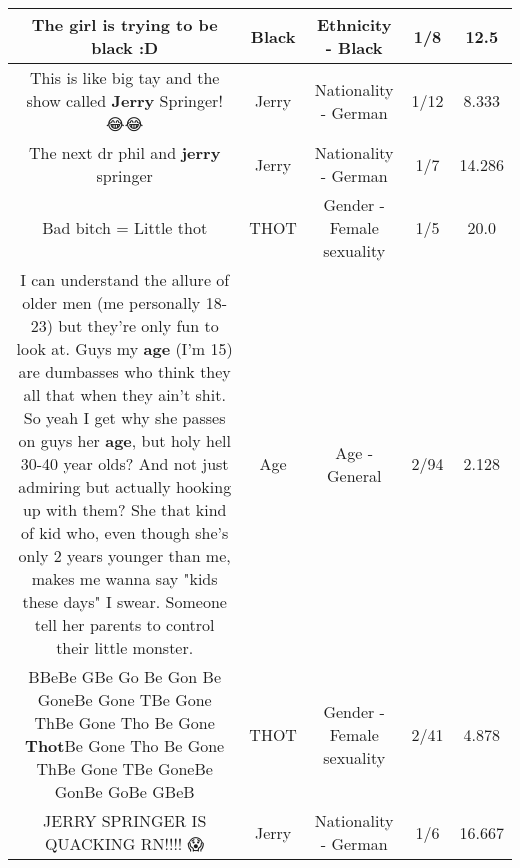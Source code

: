 \documentclass[11pt]{article}
\newlength\mylength
\begin{document}
\begin{center}
\begin{longtable}{|C{.65\mylength}|C{.30\mylength}|C{.12\mylength}|C{.12\mylength}|C{.12\mylength}|}
  \small The girl is trying to be \textbf{black} :D\normalsize   & Black & Ethnicity - Black & 1/8 & 12.5 \\  \hline
  \small This is like big tay and the show called \textbf{Jerry} Springer! 😂😂\normalsize   & Jerry & Nationality - German & 1/12 & 8.333 \\  \hline
  \small The next dr phil and \textbf{jerry} springer\normalsize   & Jerry & Nationality - German & 1/7 & 14.286 \\  \hline
  \small Bad bitch =  Little thot\normalsize   & THOT & Gender - Female sexuality & 1/5 & 20.0 \\  \hline
  \small I can understand the allure of older men (me personally 18-23) but they're only fun to look at. Guys my \textbf{age} (I'm 15) are dumbasses who think they all that when they ain't shit. So yeah I get why she passes on guys her \textbf{age}, but holy hell 30-40 year olds? And not just admiring but actually hooking up with them? She that kind of kid who, even though she's only 2 years younger than me, makes me wanna say "kids these days" I swear. Someone tell her parents to control their little monster.\normalsize   & Age & Age - General & 2/94 & 2.128 \\  \hline
  \small BBeBe GBe Go Be Gon Be GoneBe Gone TBe Gone ThBe Gone Tho Be Gone \textbf{Thot}Be Gone Tho Be Gone ThBe Gone TBe GoneBe GonBe GoBe GBeB\normalsize   & THOT & Gender - Female sexuality & 2/41 & 4.878 \\  \hline
  \small JERRY SPRINGER IS QUACKING RN!!!! 😱\normalsize   & Jerry & Nationality - German & 1/6 & 16.667 \\  \hline

\end{longtable}
\end{center}
\end{document}

